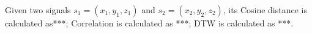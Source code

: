Given two signals $s_1 = (x_1, y_1, z_1)$ and $s_2 = (x_2, y_2, z_2)$, its Cosine distance is calculated as***;   Correlation is calculated as ***; DTW is calculated as ***.



